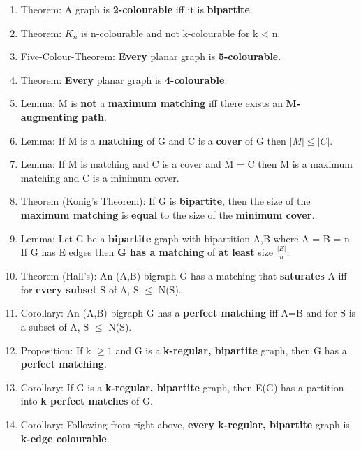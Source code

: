 \documentclass[]{article}
\begin{document}
\begin{enumerate}
\item
  Theorem: A graph is \textbf{2-colourable} iff it is
  \textbf{bipartite}.
\item
  Theorem: $K_n$ is n-colourable and not k-colourable for k \textless{}
  n.
\item
  Five-Colour-Theorem: \textbf{Every} planar graph is
  \textbf{5-colourable}.
\item
  Theorem: \textbf{Every} planar graph is \textbf{4-colourable}.
\item
  Lemma: M is \textbf{not} a \textbf{maximum matching} iff there exists
  an \textbf{M-augmenting path}.
\item
  Lemma: If M is a \textbf{matching} of G and C is a \textbf{cover} of G
  then $|M| \leq |C|$.
\item
  Lemma: If M is matching and C is a cover and \textbar{}M\textbar{} =
  \textbar{}C\textbar{} then M is a maximum matching and C is a minimum
  cover.
\item
  Theorem (Konig's Theorem): If G is \textbf{bipartite}, then the size
  of the \textbf{maximum matching} is \textbf{equal} to the size of the
  \textbf{minimum cover}.
\item
  Lemma: Let G be a \textbf{bipartite} graph with bipartition A,B where
  \textbar{}A\textbar{} = \textbar{}B\textbar{} = n. If G has
  \textbar{}E\textbar{} edges then \textbf{G has a matching} of
  \textbf{at least} size $\frac{|E|}{n}$.
\item
  Theorem (Hall's): An (A,B)-bigraph G has a matching that
  \textbf{saturates} A iff for \textbf{every subset} S of A,
  \textbar{}S\textbar{} $\leq$ \textbar{}N(S)\textbar{}.
\item
  Corollary: An (A,B) bigraph G has a \textbf{perfect matching} iff
  \textbar{}A\textbar{}=\textbar{}B\textbar{} and for S is a subset of
  A, \textbar{}S\textbar{} $\leq$ \textbar{}N(S)\textbar{}.
\item
  Proposition: If k $\geq 1$ and G is a \textbf{k-regular, bipartite}
  graph, then G has a \textbf{perfect matching}.
\item
  Corollary: If G is a \textbf{k-regular, bipartite} graph, then E(G)
  has a partition into \textbf{k perfect matches} of G.
\item
  Corollary: Following from right above, \textbf{every k-regular,
  bipartite} graph is \textbf{k-edge colourable}.
\end{enumerate}
\end{document}
